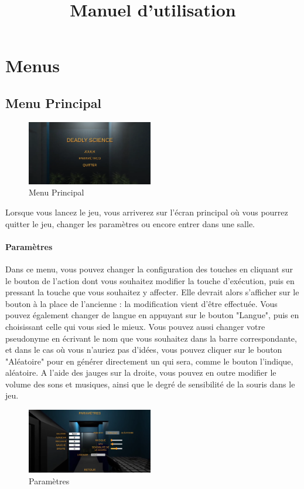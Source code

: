 \documentclass{article}
\title{Manuel d'utilisation}
\begin{document}
\maketitle
\tableofcontents

\newpage
\section{Menus}
\subsection{Menu Principal}

\begin{figure}[H]
	\centering
	\includegraphics[width=0.49\textwidth]{MainMenu.png}
	\caption{Menu Principal}
	\label{Menu Principal}
\end{figure}

Lorsque vous lancez le jeu, vous arriverez sur l'écran principal où vous pourrez quitter le jeu, changer les paramètres ou encore entrer dans une salle.
\paragraph{Paramètres}

Dans ce menu, vous pouvez changer la configuration des touches en cliquant sur le bouton de l'action dont vous souhaitez modifier la touche d'exécution, puis en pressant la touche que vous souhaitez y affecter. Elle devrait alors s'afficher sur le bouton à la place de l'ancienne : la modification vient d'être effectuée. Vous pouvez également changer de langue en appuyant sur le bouton "Langue", puis en choisissant celle qui vous sied le mieux. Vous pouvez aussi changer votre pseudonyme en écrivant le nom que vous souhaitez dans la barre correspondante, et dans le cas où vous n'auriez pas d'idées, vous pouvez cliquer sur le bouton "Aléatoire" pour en générer directement un qui sera, comme le bouton l'indique, aléatoire. A l'aide des jauges sur la droite, vous pouvez en outre modifier le volume des sons et musiques, ainsi que le degré de sensibilité de la souris dans le jeu.

\begin{figure}[H]
	\centering
	\includegraphics[width=0.49\textwidth]{parametres.png}
	\caption{Paramètres}
	\label{Paramètres}
\end{figure}
\end{document}
